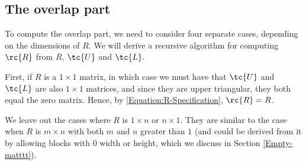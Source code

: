 \subsection{The overlap part}
\label{Section:Two-Step-Splitting}
To compute the overlap part, we need to consider four separate cases, depending on the dimensions of $R$. We will derive a recursive algorithm for computing $\rc{R}$ from $R$, $\tc{U}$ and $\tc{L}$. %

First, if $R$ is a $1 \times 1$ matrix, in which case we must have that $\tc{U}$ and $\tc{L}$ are also $1 \times 1$ matrices, and since they are upper triangular, they both equal the zero matrix. Hence, by \eqref{Equation:R-Specification}, $\rc{R} = R$.

We leave out the cases where $R$ is $1 \times n$ or $n \times 1$. They are similar to the case when $R$ is $m \times n$ with both $m$ and $n$ greater than $1$ (and could be derived from it by allowing blocks with $0$ width or height, which we discuss in Section \ref{Empty-matttt}).

